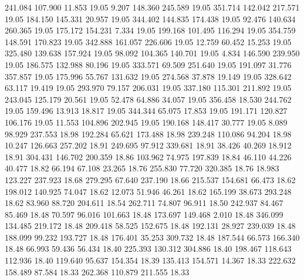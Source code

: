  241.084  107.900   11.853        19.05
   9.207  148.360  245.589        19.05
 351.714  142.042  217.571        19.05
 184.150  145.331   20.957        19.05
 344.402  144.835  174.438        19.05
  92.476  140.634  260.365        19.05
 175.172  154.231    7.334        19.05
 199.168  101.495  116.294        19.05
 354.759  148.591  170.823        19.05
 342.888  161.057  226.606        19.05
  12.759   60.452   15.253        19.05
 325.480  139.638  157.924        19.05
  98.092  104.365  140.701        19.05
   4.834  146.590  239.950        19.05
 186.575  132.988   80.196        19.05
 333.571   69.509  251.640        19.05
 191.097   31.776  357.857        19.05
 175.996   55.767  131.632        19.05
 274.568   37.878   19.149        19.05
 328.642   63.117   19.419        19.05
 293.970   79.157  206.031        19.05
 337.180  115.301  211.892        19.05
 243.045  125.179   20.561        19.05
  52.478   64.886   34.057        19.05
 356.458   18.530  244.762        19.05
 159.496   13.913   18.817        19.05
 344.344   65.075   17.853        19.05
 191.171  120.827  106.176        19.05
  11.553  104.896  202.945        19.05
 190.168  148.417   30.777        19.05
   8.089   98.929  237.553        18.98
 192.284   65.621  173.488        18.98
 239.248  110.086   94.204        18.98
  10.247  126.663  257.202        18.91
 249.695   97.912  339.681        18.91
  38.426   40.269   18.912        18.91
 304.431  146.702  200.359        18.86
 103.962   74.975  197.839        18.84
  46.110   44.226   40.477        18.82
  66.194   67.108   23.265        18.76
 255.830   77.720  320.385        18.76
  18.983  123.227  237.923        18.68
 279.295   67.640  237.190        18.66
 215.537  154.681   66.473        18.62
 198.012  140.925   74.047        18.62
  12.073   51.946   46.261        18.62
 165.199   38.673  293.248        18.62
  83.960   88.720  204.611        18.54
 262.711   74.807   96.911        18.50
 242.937   84.467   85.469        18.48
  70.597   96.016  101.663        18.48
 173.697  149.468    2.010        18.48
 346.099  134.485  219.172        18.48
 209.418   58.525  152.675        18.48
 192.131   28.927  239.039        18.48
 188.099   99.232  193.727        18.48
 176.401   35.253  309.732        18.48
 187.544   66.573  166.340        18.48
  66.993   59.436   56.434        18.40
 225.393  130.312  304.886        18.40
 198.467  118.643  112.936        18.40
 119.640   95.637  154.354        18.39
 135.413  154.571   14.367        18.33
 222.632  158.489   87.584        18.33
 262.368  110.879  211.555        18.33
